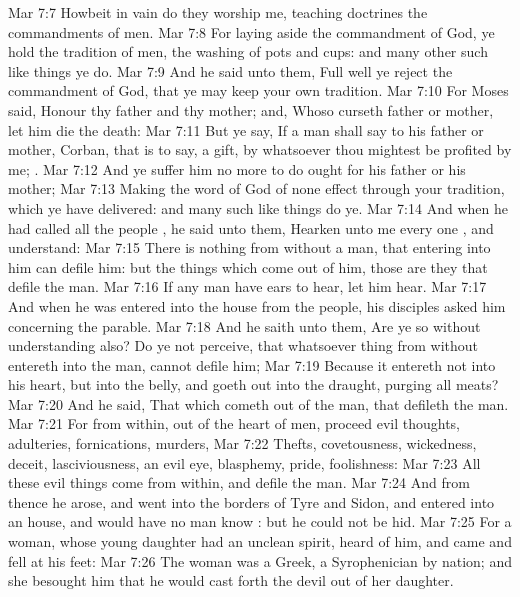 \vs Mar 7:7 Howbeit in vain do they worship me, teaching  doctrines the commandments of men.
\vs Mar 7:8 For laying aside the commandment of God, ye hold the tradition of men,  the washing of pots and cups: and many other such like things ye do.
\vs Mar 7:9 And he said unto them, Full well ye reject the commandment of God, that ye may keep your own tradition.
\vs Mar 7:10 For Moses said, Honour thy father and thy mother; and, Whoso curseth father or mother, let him die the death:
\vs Mar 7:11 But ye say, If a man shall say to his father or mother,  Corban, that is to say, a gift, by whatsoever thou mightest be profited by me; .
\vs Mar 7:12 And ye suffer him no more to do ought for his father or his mother;
\vs Mar 7:13 Making the word of God of none effect through your tradition, which ye have delivered: and many such like things do ye.
\vs Mar 7:14 And when he had called all the people , he said unto them, Hearken unto me every one , and understand:
\vs Mar 7:15 There is nothing from without a man, that entering into him can defile him: but the things which come out of him, those are they that defile the man.
\vs Mar 7:16 If any man have ears to hear, let him hear.
\vs Mar 7:17 And when he was entered into the house from the people, his disciples asked him concerning the parable.
\vs Mar 7:18 And he saith unto them, Are ye so without understanding also? Do ye not perceive, that whatsoever thing from without entereth into the man,  cannot defile him;
\vs Mar 7:19 Because it entereth not into his heart, but into the belly, and goeth out into the draught, purging all meats?
\vs Mar 7:20 And he said, That which cometh out of the man, that defileth the man.
\vs Mar 7:21 For from within, out of the heart of men, proceed evil thoughts, adulteries, fornications, murders,
\vs Mar 7:22 Thefts, covetousness, wickedness, deceit, lasciviousness, an evil eye, blasphemy, pride, foolishness:
\vs Mar 7:23 All these evil things come from within, and defile the man.
\vs Mar 7:24 And from thence he arose, and went into the borders of Tyre and Sidon, and entered into an house, and would have no man know : but he could not be hid.
\vs Mar 7:25 For a  woman, whose young daughter had an unclean spirit, heard of him, and came and fell at his feet:
\vs Mar 7:26 The woman was a Greek, a Syrophenician by nation; and she besought him that he would cast forth the devil out of her daughter.
